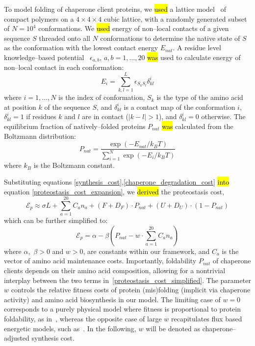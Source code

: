 \documentclass[10pt,letterpaper]{article}
\begin{document}
To model folding of chaperone client proteins, we \hl{used} a lattice model~\cite{Shakhnovich1990Enumeration,Sikosek2014Biophysics} of compact polymers on a $4\times4\times4$ cubic lattice, with a randomly generated subset of $N=10^{4}$ conformations. We \hl{used} energy of non--local contacts of a given sequence $S$ threaded onto all $N$ conformations to determine the native state of $S$ as the conformation with the lowest contact energy $E_{nat}$. A residue level knowledge--based potential~\cite{Miyazawa1999SelfConsistent} $\epsilon_{a,b},\, a,b=1,\dots,20$ \hl{was} used to calculate energy of non--local contact in each conformation:
\begin{equation}
	\label{protein_globule_energy}
	E_{i} = \sum\limits_{k,l=1}^{L}\epsilon_{S_{k}S_{l}}\delta^{i}_{kl}
\end{equation}
where $i=1,\dots,N$ is the index of conformation, $S_{k}$ is the type of the amino acid at position $k$ of the sequence $S$, and $\delta^{i}_{kl}$ is a contact map of the conformation $i$, $\delta^{i}_{kl}=1$ if residues $k$ and $l$ are in contact ($|k-l|>1$), and $\delta^{i}_{kl}=0$ otherwise. The equilibrium fraction of natively--folded proteins $P_{nat}$ \hl{was} calculated from the Boltzmann distribution:
\begin{equation}
	\label{pnat_boltzmann}
	P_{nat} = \frac{\exp\left(-E_{nat}/k_{B}T\right)}{\sum\limits_{i=1}^{N}\exp\left(-E_{i}/k_{B}T\right)}
\end{equation}
where $k_{B}$ is the Boltzmann constant. 


Substituting equations \eqref{synthesis_cost},\eqref{chaperone_degradation_cost} \hl{into} equation \eqref{proteostasis_cost_expansion}, we \hl{derived} the proteostasis cost, 
\begin{equation}
	\label{proteostasis_cost_detailed}
	\mathcal{E}_{p} \approx \sigma L + \sum\limits_{a=1}^{20}C_{a}n_{a} + (F+D_{F})\cdot P_{nat} + (U+D_{U})\cdot\left(1-P_{nat}\right)
\end{equation}
which can be further simplified to:
\begin{equation}
	\label{proteostasis_cost_simplified}
	\mathcal{E}_{p} = \alpha - \beta\left(P_{nat} - w\cdot\sum\limits_{a=1}^{20}C_{a}n_{a} \right)
\end{equation}
where $\alpha$,\, $\beta > 0$ and $w>0$, are constants within our framework, and $C_{a}$ is the vector of amino acid maintenance costs. Importantly, foldability $P_{nat}$ of chaperone clients depends on their amino acid composition, allowing for a nontrivial interplay between the two terms in~\eqref{proteostasis_cost_simplified}. The parameter $w$ controls the relative fitness costs of protein (mis)folding (implicit via chaperone activity) and amino acid biosynthesis in our model. The limiting case of $w=0$ corresponds to a purely physical model where fitness is proportional to protein foldability, as in~\cite{Taverna2002Why,Bloom2006Protein,Zeldovich2007First,Lobkovsky2010Universal}, whereas the opposite case of large $w$ recapitulates flux based energetic models, such as~\cite{Akashi2002Metabolic,Krick2014Amino,Kepp2014Model}. In the following, $w$ will be denoted as chaperone--adjusted synthesis cost.
 
\end{document}
